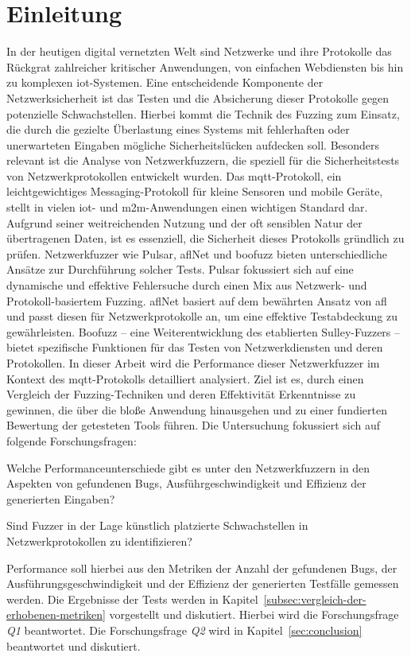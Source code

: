 \section{Einleitung}\label{sec:einleitung}
In der heutigen digital vernetzten Welt sind Netzwerke und ihre Protokolle das Rückgrat zahlreicher kritischer Anwendungen,
von einfachen Webdiensten bis hin zu komplexen \gls{iot}-Systemen.
Eine entscheidende Komponente der Netzwerksicherheit ist das Testen und die Absicherung dieser Protokolle gegen potenzielle Schwachstellen.
Hierbei kommt die Technik des Fuzzing zum Einsatz, die durch die gezielte Überlastung eines Systems mit fehlerhaften oder
unerwarteten Eingaben mögliche Sicherheitslücken aufdecken soll.
Besonders relevant ist die Analyse von Netzwerkfuzzern, die speziell für die Sicherheitstests von Netzwerkprotokollen entwickelt wurden.
Das \gls{mqtt}-Protokoll, ein leichtgewichtiges Messaging-Protokoll für kleine Sensoren und mobile Geräte, stellt in vielen
\gls{iot}- und \gls{m2m}-Anwendungen einen wichtigen Standard dar.
Aufgrund seiner weitreichenden Nutzung und der oft sensiblen Natur der übertragenen Daten, ist es essenziell, die Sicherheit
dieses Protokolls gründlich zu prüfen.
Netzwerkfuzzer wie Pulsar, \gls{afl}Net und boofuzz bieten unterschiedliche Ansätze zur Durchführung solcher Tests.
Pulsar fokussiert sich auf eine dynamische und effektive Fehlersuche durch einen Mix aus Netzwerk- und Protokoll-basiertem
Fuzzing.
\gls{afl}Net basiert auf dem bewährten Ansatz von \gls{afl} und passt diesen für Netzwerkprotokolle an, um eine effektive
Testabdeckung zu gewährleisten.
Boofuzz -- eine Weiterentwicklung des etablierten Sulley-Fuzzers -- bietet spezifische Funktionen für das Testen von
Netzwerkdiensten und deren Protokollen.
In dieser Arbeit wird die Performance dieser Netzwerkfuzzer im Kontext des \gls{mqtt}-Protokolls detailliert analysiert.
Ziel ist es, durch einen Vergleich der Fuzzing-Techniken und deren Effektivität Erkenntnisse zu gewinnen, die über die bloße
Anwendung hinausgehen und zu einer fundierten Bewertung der getesteten Tools führen.
Die Untersuchung fokussiert sich auf folgende Forschungsfragen:
\begin{questions}\label{researc-questions}
    \item Welche Performanceunterschiede gibt es unter den Netzwerkfuzzern in den Aspekten von gefundenen Bugs, Ausführgeschwindigkeit
        und Effizienz der generierten Eingaben?
    \item Sind Fuzzer in der Lage künstlich platzierte Schwachstellen in Netzwerkprotokollen zu identifizieren?
\end{questions}
Performance soll hierbei aus den Metriken der Anzahl der gefundenen Bugs, der Ausführungsgeschwindigkeit und der Effizienz
der generierten Testfälle gemessen werden.
Die Ergebnisse der Tests werden in Kapitel~\ref{subsec:vergleich-der-erhobenen-metriken} vorgestellt und diskutiert.
Hierbei wird die Forschungsfrage \textit{Q1} beantwortet.
Die Forschungsfrage \textit{Q2} wird in Kapitel~\ref{sec:conclusion} beantwortet und diskutiert.